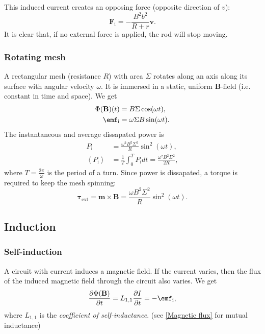 \documentclass[a4paper, 12pt]{article}
\renewcommand{\vec}[1]{\mathbf{#1}}
\newcommand{\B}{\ensuremath{\vec{B}}}
\begin{document}
            This induced current creates an opposing force (opposite direction of $v$): 
            \begin{equation}
                \vec{F}_\text{i} = -\frac{B^2b^2}{R+r}\vec{v}.
            \end{equation}
            It is clear that, if no external force is applied, the rod will stop moving.

        \subsubsection{Rotating mesh}
            A rectangular mesh (resistance $R$) with area $\Sigma$ rotates along an axis along its surface with angular velocity $\omega$. 
            It is immersed in a static, uniform \B-field (i.e. constant in time and space).
            We get 
            \begin{align}
                \Phi(\B)(t) &= B\Sigma\cos (\omega t), \\
                \emf_\text{i} &= \omega\Sigma B \sin (\omega t).
            \end{align}
            The instantaneous and average dissapated power is 
            \begin{align}
                P_\text{i} &= \frac{\omega^2 B^2 \Sigma^2}{R}\sin^2(\omega t),\\
                \left<P_\text{i}\right> &= \frac{1}{T}\int_0^T P_\text{i}dt = \frac{\omega^2 B^2 \Sigma^2}{2R},
            \end{align}
            where $T = \frac{2\pi}{\omega}$ is the period of a turn.
            Since power is dissapated, a torque is required to keep the mesh spinning: 
            \begin{equation}
                \vec{\tau}_\text{ext} = \vec{m}\times\B = \frac{\omega B^2 \Sigma^2}{R}\sin^2(\omega t).
            \end{equation}
        
    \subsection{Induction}
        \subsubsection{Self-induction}
            A circuit with current induces a magnetic field. 
            If the current varies, then the flux of the induced magnetic field through the circuit also varies. 
            We get
            \begin{equation}
                \frac{\partial \Phi(\B)}{\partial t} = L_{1,1}\frac{\partial I}{\partial t} = -\emf_{\text{i}},
            \end{equation}
            where $L_{1,1}$ is the \textit{coefficient of self-inductance}. (see \ref{Magnetic flux} for mutual inductance)
            
\end{document}
